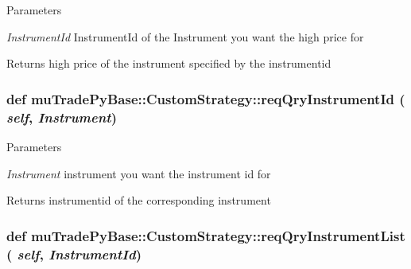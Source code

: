 \begin{DoxyParams}{Parameters}
\item[{\em InstrumentId}]InstrumentId of the Instrument you want the high price for \end{DoxyParams}
\begin{DoxyReturn}{Returns}
high price of the instrument specified by the instrumentid 
\end{DoxyReturn}
\hypertarget{classmuTradePyBase_1_1CustomStrategy_a3828d43f41c88b74b14b920f29f96f9b}{
\subsubsection[{reqQryInstrumentId}]{\setlength{\rightskip}{0pt plus 5cm}def muTradePyBase::CustomStrategy::reqQryInstrumentId ( {\em self}, \/   {\em Instrument})}}
\label{classmuTradePyBase_1_1CustomStrategy_a3828d43f41c88b74b14b920f29f96f9b}

\begin{DoxyParams}{Parameters}
\item[{\em Instrument}]instrument you want the instrument id for \end{DoxyParams}
\begin{DoxyReturn}{Returns}
instrumentid of the corresponding instrument 
\end{DoxyReturn}
\hypertarget{classmuTradePyBase_1_1CustomStrategy_a1bfe7ef1cd4ad2b136eb2e7bb97005a5}{
\subsubsection[{reqQryInstrumentList}]{\setlength{\rightskip}{0pt plus 5cm}def muTradePyBase::CustomStrategy::reqQryInstrumentList ( {\em self}, \/   {\em InstrumentId})}}
\label{classmuTradePyBase_1_1CustomStrategy_a1bfe7ef1cd4ad2b136eb2e7bb97005a5}


